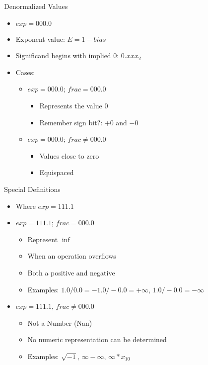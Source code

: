 \begin{frame}{Denormalized Values}
  \begin{itemize}
  \item $exp = 000.0$
  \item Exponent value: $E = 1 - bias$
  \item Significand begins with implied 0: $0.xxx_{2}$
  \item Cases:
    \begin{itemize}
    \item $exp = 000.0$; $frac = 000.0$
      \begin{itemize}
      \item Represents the value 0
      \item Remember sign bit?: $+0$ and $-0$
      \end{itemize}
    \item $exp = 000.0$; $frac \ne 000.0$
      \begin{itemize}
      \item Values close to zero
      \item Equispaced
      \end{itemize}
    \end{itemize}
  \end{itemize}
\end{frame}
\begin{frame}{Special Definitions}
  \begin{itemize}
  \item Where $exp = 111.1$
  \item $exp = 111.1$; $frac = 000.0$
    \begin{itemize}
    \item Represent $\inf$
    \item When an operation overflows
    \item Both a positive and negative
    \item Examples: $1.0 / 0.0 = -1.0 / -0.0 = +\infty$, $1.0 / -0.0 = -\infty$
    \end{itemize}
  \item $exp = 111.1$, $frac \ne 000.0$
    \begin{itemize}
    \item Not a Number (Nan)
    \item No numeric representation can be determined
    \item Examples: $\sqrt{-1}$, $\infty - \infty$, $\infty * x_{10}$
    \end{itemize}
  \end{itemize}
\end{frame}
